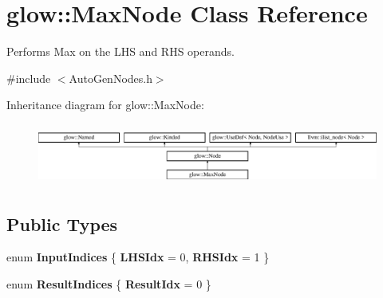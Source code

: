 \hypertarget{classglow_1_1_max_node}{}\section{glow\+:\+:Max\+Node Class Reference}
\label{classglow_1_1_max_node}


Performs Max on the L\+HS and R\+HS operands.  




{\ttfamily \#include $<$Auto\+Gen\+Nodes.\+h$>$}

Inheritance diagram for glow\+:\+:Max\+Node\+:\begin{figure}[H]
\begin{center}
\leavevmode
\includegraphics[height=2.028986cm]{classglow_1_1_max_node}
\end{center}
\end{figure}
\subsection*{Public Types}
\begin{DoxyCompactItemize}
\item 
\mbox{\label{classglow_1_1_max_node_a677617d877399c538537331960d5d0d2}} 
enum {\bfseries Input\+Indices} \{ {\bfseries L\+H\+S\+Idx} = 0, 
{\bfseries R\+H\+S\+Idx} = 1
 \}
\item 
\mbox{\label{classglow_1_1_max_node_a43b1f459b450bdcb3edfe04a8caae7cc}} 
enum {\bfseries Result\+Indices} \{ {\bfseries Result\+Idx} = 0
 \}
\end{DoxyCompactItemize}
